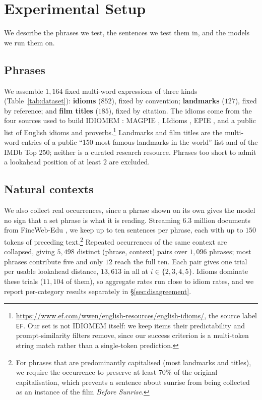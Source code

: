 \section{Experimental Setup}
\label{sec:setup}



We describe the phrases we test, the sentences we test them in, and the models
we run them on.

\subsection{Phrases}

We assemble $1{,}164$ fixed multi-word expressions of three kinds
(Table~\ref{tab:dataset}): \textbf{idioms} ($852$), fixed by convention;
\textbf{landmarks} ($127$), fixed by reference; and \textbf{film titles}
($185$), fixed by citation. The idioms come from the four sources used to build
IDIOMEM \citep{haviv-etal-2023-understanding}: MAGPIE
\citep{haagsma-etal-2020-magpie}, LIdioms \citep{moussallem-etal-2018-lidioms},
EPIE \citep{saxena-paul-2020-epie}, and a public list of English idioms and
proverbs.\footnote{\url{https://www.ef.com/wwen/english-resources/english-idioms/},
the source \citet{haviv-etal-2023-understanding} label \texttt{EF}. Our set is
not IDIOMEM itself: we keep items their predictability and prompt-similarity
filters remove, since our success criterion is a multi-token string match rather
than a single-token prediction.} Landmarks and film titles are the multi-word
entries of a public ``150 most famous landmarks in the world'' list and of the
IMDb Top 250; neither is a curated research resource. Phrases too short to admit
a lookahead position of at least $2$ are excluded.

\subsection{Natural contexts}

We also collect real occurrences, since a phrase shown on its own gives the
model no sign that a set phrase is what it is reading. Streaming $6.3$ million
documents from FineWeb-Edu \citep{penedo-etal-2024-fineweb}, we keep up to ten
sentences per phrase, each with up to $150$ tokens of preceding
text.\footnote{For phrases that are predominantly capitalised (most landmarks
and titles), we require the occurrence to preserve at least $70\%$ of the
original capitalisation, which prevents a sentence about sunrise from being
collected as an instance of the film \textit{Before Sunrise}.} Repeated
occurrences of the same context are collapsed, giving $5{,}498$ distinct
(phrase, context) pairs over $1{,}096$ phrases; most phrases contribute five and
only $12$ reach the full ten. Each pair gives one trial per usable lookahead
distance, $13{,}613$ in all at $i \in \{2,3,4,5\}$. Idioms dominate these trials
($11{,}104$ of them), so aggregate rates run close to idiom rates, and we report
per-category results separately in \S\ref{sec:disagreement}.

